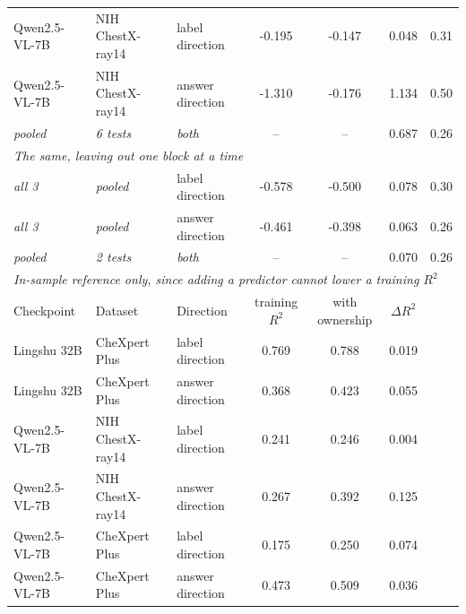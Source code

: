 \documentclass{article}
\providecommand{\DIFaddendFL}{} %
\DeclareRobustCommand{\DIFaddendFL}{\DIFOaddendFL \let\includegraphics\DIFOincludegraphics} %
\begin{document}
\begin{table}[htbp]
{\begin{tabular}{lllcccc}
Qwen2.5-VL-7B & NIH ChestX-ray14 & label direction & -0.195 & -0.147 & 0.048 & 0.31 \\
Qwen2.5-VL-7B & NIH ChestX-ray14 & answer direction & -1.310 & -0.176 & 1.134 & 0.50 \\
\textit{pooled} & \textit{6 tests} & \textit{both} & -- & -- & 0.687 & 0.26 \\
\midrule
\multicolumn{7}{l}{\textit{The same, leaving out one block at a time}} \\
\midrule
\textit{all 3} & \textit{pooled} & label direction & -0.578 & -0.500 & 0.078 & 0.30 \\
\textit{all 3} & \textit{pooled} & answer direction & -0.461 & -0.398 & 0.063 & 0.26 \\
\textit{pooled} & \textit{2 tests} & \textit{both} & -- & -- & 0.070 & 0.26 \\
\midrule
\multicolumn{7}{l}{\textit{In-sample reference only, since adding a predictor cannot lower a training $R^2$}} \\
Checkpoint & Dataset & Direction & training $R^2$ & with ownership & $\Delta R^2$ & \\
\midrule
Lingshu 32B & CheXpert Plus & label direction & 0.769 & 0.788 & 0.019 & \\
Lingshu 32B & CheXpert Plus & answer direction & 0.368 & 0.423 & 0.055 & \\
Qwen2.5-VL-7B & NIH ChestX-ray14 & label direction & 0.241 & 0.246 & 0.004 & \\
Qwen2.5-VL-7B & NIH ChestX-ray14 & answer direction & 0.267 & 0.392 & 0.125 & \\
Qwen2.5-VL-7B & CheXpert Plus & label direction & 0.175 & 0.250 & 0.074 & \\
Qwen2.5-VL-7B & CheXpert Plus & answer direction & 0.473 & 0.509 & 0.036 & \\
\bottomrule
\end{tabular}}
\DIFaddendFL \end{table}
\end{document}
